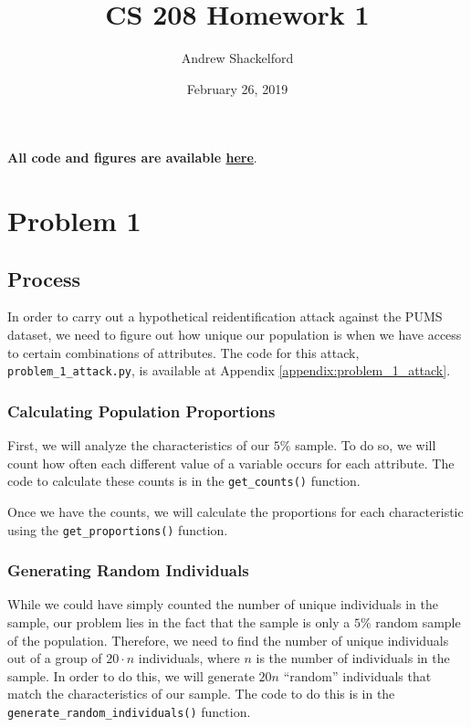 \documentclass[12pt]{article}
\title{CS 208 Homework 1}
\author{Andrew Shackelford}
\date{February 26, 2019}
\def\cl{\lstinline}
\begin{document}
\maketitle

\textbf{All code and figures are available \href{https://github.com/andrew-shackelford/cs208/tree/master/1}{here}}.

{
  \hypersetup{linkcolor=black, hidelinks}
  \tableofcontents
}

\newpage

\section{Problem 1}

\subsection{Process}

\noindent

In order to carry out a hypothetical reidentification attack against the PUMS dataset, we need to figure out how unique our population is when we have access to certain combinations of attributes. The code for this attack, \cl{problem_1_attack.py}, is available at Appendix \ref{appendix:problem_1_attack}.

\subsubsection{Calculating Population Proportions}

\noindent

First, we will analyze the characteristics of our $5\%$ sample. To do so, we will count how often each different value of a variable occurs for each attribute. The code to calculate these counts is in the \cl{get_counts()} function.

\medskip

Once we have the counts, we will calculate the proportions for each characteristic using the \cl{get_proportions()} function.

\subsubsection{Generating Random Individuals}

\noindent

While we could have simply counted the number of unique individuals in the sample, our problem lies in the fact that the sample is only a $5\%$ random sample of the population. Therefore, we need to find the number of unique individuals out of a group of $20 \cdot n$ individuals, where $n$ is the number of individuals in the sample. In order to do this, we will generate $20n$ ``random'' individuals that match the characteristics of our sample. The code to do this is in the \cl{generate_random_individuals()} function.
\end{document}
